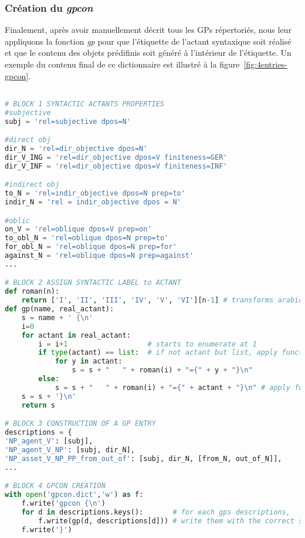 \subsubsection{Création du \emph{gpcon}}
Finalement, après avoir manuellement décrit tous les \acp{GP} répertoriés, nous leur appliquons la fonction \emph{gp} pour que l'étiquette de l'actant syntaxique soit réalisé et que le contenu des objets prédifinis soit généré à l'intérieur de l'étiquette. Un exemple du contenu final de ce dictionnaire est illustré à la figure~\ref{fig:4entries-gpcon}.

\begin{lstlisting}[language=Python, caption = Création du dictionnaire de patrons de régime]

# BLOCK 1 SYNTACTIC ACTANTS PROPERTIES
#subjective
subj = 'rel=subjective dpos=N'

#direct obj
dir_N = 'rel=dir_objective dpos=N'
dir_V_ING = 'rel=dir_objective dpos=V finiteness=GER'
dir_V_INF = 'rel=dir_objective dpos=V finiteness=INF'

#indirect obj
to_N = 'rel=indir_objective dpos=N prep=to'
indir_N = 'rel = indir_objective dpos = N'

#oblic
on_V = 'rel=oblique dpos=V prep=on'
to_obl_N = 'rel=oblique dpos=N prep=to' 
for_obl_N = 'rel=oblique dpos=N prep=for'
against_N = 'rel=oblique dpos=N prep=against'
...

# BLOCK 2 ASSIGN SYNTACTIC LABEL to ACTANT
def roman(n):
    return ['I', 'II', 'III', 'IV', 'V', 'VI'][n-1] # transforms arabic numbers in roman numbers
def gp(name, real_actant):
    s = name + ' {\n'
    i=0
    for actant in real_actant:
        i = i+1                   # starts to enumerate at 1
        if type(actant) == list:  # if not actant but list, apply function to actants in list
            for y in actant:
                s = s + "   " + roman(i) + "={" + y + "}\n"
        else:
            s = s + "   " + roman(i) + "={" + actant + "}\n" # apply function to actant
    s = s + '}\n'
    return s 

# BLOCK 3 CONSTRUCTION OF A GP ENTRY
descriptions = {
'NP_agent_V': [subj],
'NP_agent_V_NP': [subj, dir_N],
'NP_asset_V_NP_PP_from_out_of': [subj, dir_N, [from_N, out_of_N]],
...

# BLOCK 4 GPCON CREATION
with open('gpcon.dict','w') as f: 
    f.write('gpcon {\n')
    for d in descriptions.keys():       # for each gps descriptions,
        f.write(gp(d, descriptions[d])) # write them with the correct syntactic label
    f.write('}')
\end{lstlisting}

